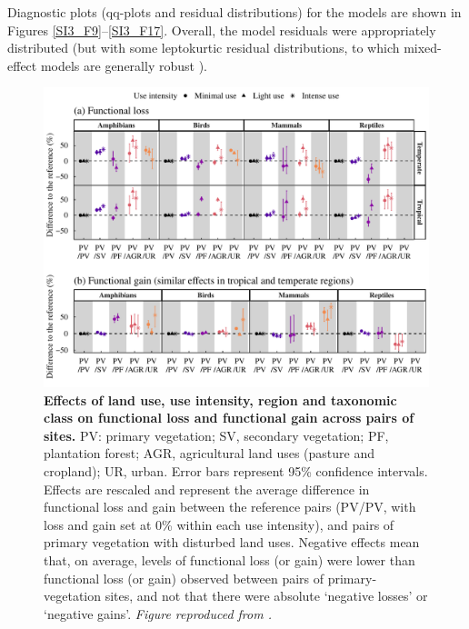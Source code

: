 Diagnostic plots (qq-plots and residual distributions) for the models are shown in Figures \ref{SI3_F9}–\ref{SI3_F17}. Overall, the model residuals were appropriately distributed (but with some leptokurtic residual distributions, to which mixed-effect models are generally robust \citep{Schielzeth2020}).

\begin{figure}[h!]
\centering
\includegraphics[scale=0.75]{figures/Chapter_FD/Figure6}
\caption[Effects of land use, use intensity, region and taxonomic class on functional loss and functional gain across pairs of sites.]{\textbf{Effects of land use, use intensity, region and taxonomic class on functional loss and functional gain across pairs of sites.}  PV: primary vegetation; SV, secondary vegetation; PF, plantation forest; AGR, agricultural land uses (pasture and cropland); UR, urban. Error bars represent 95\% confidence intervals. Effects are rescaled and represent the average difference in functional loss and gain between the reference pairs (PV/PV, with loss and gain set at 0\% within each use intensity), and pairs of primary vegetation with disturbed land uses. Negative effects mean that, on average, levels of functional loss (or gain) were lower than functional loss (or gain) observed between pairs of primary-vegetation sites, and not that there were absolute `negative losses' or `negative gains'. \textit{Figure reproduced from \citet{Etard2021}.}}
\label{chap3_fig6}
\end{figure}

